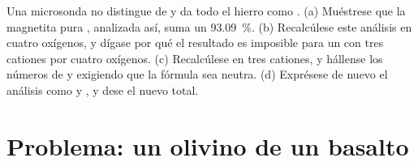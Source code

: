 \begin{exercise}[$\star\star\star$]\label{exo:b1:rock-forming-minerals:12}
Una microsonda no distingue  de  y da todo el hierro como . (a) Muéstrese que la
magnetita pura , analizada así, suma un \qty{93.09}{\percent}. (b) Recalcúlese este análisis en cuatro
oxígenos, y dígase por qué el resultado es imposible para un  con tres cationes por cuatro oxígenos. (c)
Recalcúlese en tres cationes, y hállense los números de  y  exigiendo que la fórmula sea
neutra. (d) Exprésese de nuevo el análisis como  y , y dese el nuevo total.
\end{exercise}

\section{Problema: un olivino de un basalto}

